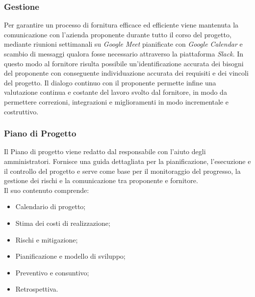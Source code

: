 \documentclass[10pt, a4paper]{article}
\begin{document}
\subsubsection{Gestione}
Per garantire un processo di fornitura efficace ed efficiente viene mantenuta la comunicazione con l'azienda proponente durante tutto il 
corso del progetto, mediante riunioni settimanali su \textit{Google Meet} pianificate con \textit{Google Calendar} e scambio di messaggi 
qualora fosse necessario attraverso la piattaforma \textit{Slack}. In questo modo al fornitore risulta possibile un'identificazione accurata
dei bisogni del proponente con conseguente individuazione accurata dei requisiti e dei vincoli del progetto. Il dialogo continuo con il 
proponente permette infine una valutazione continua e costante del lavoro svolto dal fornitore, in modo da permettere correzioni, 
integrazioni e miglioramenti in modo incrementale e costruttivo.  
\subsubsection{Piano di Progetto}
Il Piano di progetto viene redatto dal responsabile con l'aiuto degli amministratori. Fornisce una guida dettagliata per la pianificazione, 
l'esecuzione e il controllo del progetto e serve come base per il monitoraggio del progresso, la gestione dei rischi e la comunicazione tra
proponente e fornitore.\\ 
Il suo contenuto comprende:
\begin{itemize}
    \item Calendario di progetto;
    \item Stima dei costi di realizzazione;
    \item Rischi e mitigazione;
    \item Pianificazione e modello di sviluppo;
    \item Preventivo e consuntivo;
    \item Retrospettiva.
\end{itemize}
\end{document}

